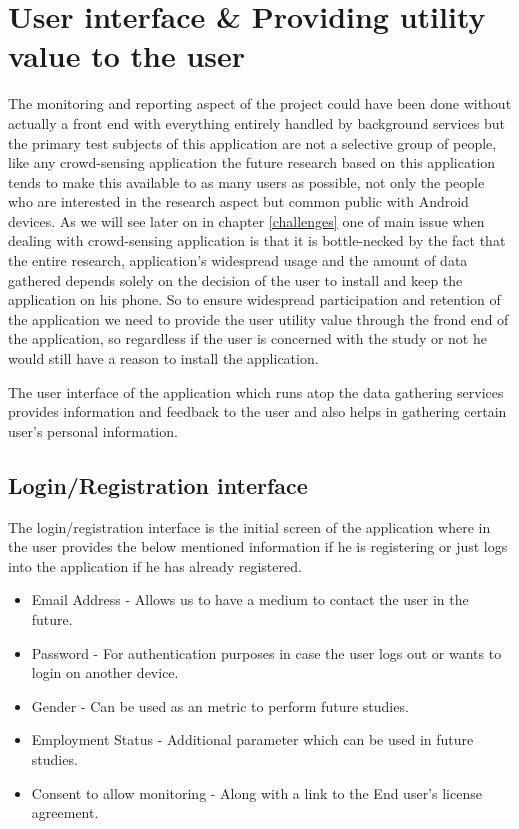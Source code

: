 \documentclass[12pt]{report}
\begin{document}
\section{User interface \& Providing utility value to the user}

The monitoring and reporting aspect of the project could have been done without actually a front end with everything entirely handled by background services but the primary test subjects of this application are not a selective group of people, like any crowd-sensing application the future research based on this application tends to make this available to as many users as possible, not only the people who are interested in the research aspect but common public with Android devices. As we will see later on in chapter \ref{challenges} one of main issue when dealing with crowd-sensing application is that it is bottle-necked by the fact that the entire research, application's widespread usage and the amount of data gathered depends solely on the decision of the user to install and keep the application on his phone. So to ensure widespread participation and retention of the application we need to provide the user utility value through the frond end of the application, so regardless if the user is concerned with the study or not he would still have a reason to install the application.

The user interface of the application which runs atop the data gathering services provides 
information and feedback to the user and also helps in gathering certain user's personal information.

\subsection{Login/Registration interface}
\label{LoginInterface}

The login/registration interface is the initial screen of the application where in the user provides the below mentioned information if he is registering or just logs into the application if he has already registered.

\begin{itemize}
\item Email Address - Allows us to have a medium to contact the user in the future.
\item Password - For authentication purposes in case the user logs out or wants to login on another device.
\item Gender - Can be used as an metric to perform future studies.
\item Employment Status - Additional parameter which can be used in future studies.
\item Consent to allow monitoring - Along with a link to the End user's license agreement.
\end{itemize}
\end{document}
